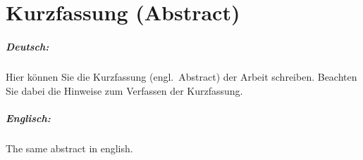 \chapter*{Kurzfassung (Abstract)}

\paragraph*{Deutsch:}

Hier können Sie die Kurzfassung (engl.~Abstract) der Arbeit schreiben. Beachten Sie dabei die Hinweise zum Verfassen der Kurzfassung.

\paragraph*{Englisch:}

The same abstract in english.
